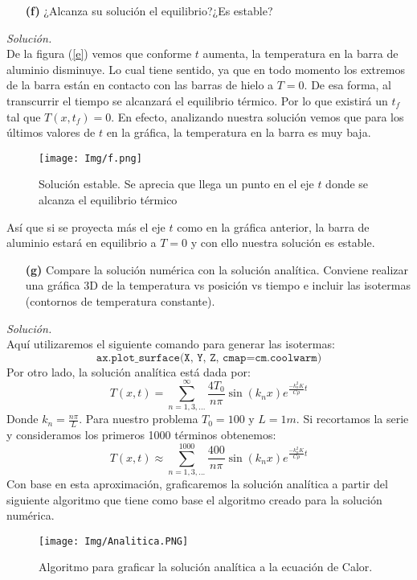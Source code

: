 \documentclass[11pt]{article}
\begin{document}
\begin{enumerate}
	\item [\textbf{(f)}] ¿Alcanza su solución el equilibrio?¿Es estable?
\end{enumerate}
\textit{Solución.}\\
	De la figura (\ref{e}) vemos que conforme $t$ aumenta, la temperatura en la barra de aluminio disminuye. Lo cual tiene sentido, ya que en todo momento los extremos de la barra están en contacto con las barras de hielo a $T=0$. De esa forma, al transcurrir el tiempo se alcanzará el equilibrio térmico. Por lo que existirá un $t_f$ tal que $T(x,t_f) = 0$. En efecto, analizando nuestra solución vemos que para los últimos valores de $t$ en la gráfica, la temperatura en la barra es muy baja. 
	\begin{figure}[h]
		\centering
		\texttt{[image: Img/f.png]}
		\caption{Solución estable. Se aprecia que llega un punto en el eje $t$ donde se alcanza el equilibrio térmico}
		\label{}
	\end{figure}

	Así que si se proyecta más el eje $t$ como en la gráfica anterior, la barra de aluminio estará en equilibrio a $T=0$ y con ello nuestra solución es estable. 

\begin{enumerate}
	\item [\textbf{(g)}] Compare la solución numérica con la solución analítica. Conviene
	realizar una gráfica 3D de la temperatura vs posición vs tiempo e incluir las isotermas (contornos de temperatura constante).
\end{enumerate}
\textit{Solución.}\\
	Aquí utilizaremos el siguiente comando para generar las isotermas: $$\texttt{ax.plot\_surface(X, Y, Z, cmap=cm.coolwarm)}$$ 
	Por otro lado, la solución analítica está dada por:
	\begin{equation}
		T(x,t) = \sum _{n=1, 3,...}^\infty \frac{4T_0}{n\pi}\sin (k_n x) e^{\frac{-k_n^2 K}{C \rho} t} 
	\end{equation}
	Donde $k_n=\frac{n\pi}{L}$. Para nuestro problema $T_0 = 100$ y $L=1m$. Si recortamos la serie y consideramos los primeros 1000 términos obtenemos:
	\begin{equation}
		T(x,t) \approx \sum _{n=1, 3,...}^{1000} \frac{400}{n\pi}\sin (k_n x) e^{\frac{-k_n^2 K}{C \rho} t} 
	\end{equation}
	Con base en esta aproximación, graficaremos la solución analítica a partir del siguiente algoritmo que tiene como base el algoritmo creado para la solución numérica. 
	\begin{figure}[h]
		\centering
		\texttt{[image: Img/Analitica.PNG]}
		\caption{Algoritmo para graficar la solución analítica a la ecuación de Calor.}
		\label{A2}
	\end{figure}
	
\end{document}
